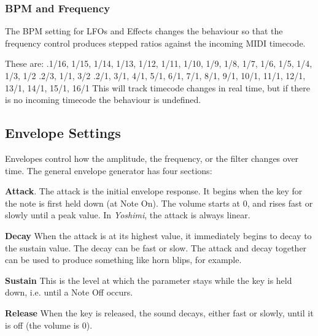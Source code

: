 \begin{flushleft}
  \begin{minipage}{\textwidth}
   \subsubsection{BPM and Frequency}
   \label{subsubsec:bpm_and_frequency}
   The BPM setting for LFOs and Effects changes the behaviour so that the frequency control produces
   stepped ratios against the incoming MIDI timecode.

   These are: \newline
    .\hspace{3em}1/16, 1/15, 1/14, 1/13, 1/12, 1/11, 1/10, 1/9, 1/8, 1/7, 1/6, 1/5, 1/4, 1/3, 1/2 \newline
    .\hspace{3em}2/3, 1/1, 3/2 \newline
    .\hspace{3em}2/1, 3/1, 4/1, 5/1, 6/1, 7/1, 8/1, 9/1, 10/1, 11/1, 12/1, 13/1, 14/1, 15/1, 16/1 \newline
    This will track timecode changes in real time, but if there is no incoming timecode the behaviour is undefined.
  \end{minipage}
\end{flushleft}

\subsection{Envelope Settings}
\label{subsec:envelope_settings}

   Envelopes control how the amplitude, the frequency, or the filter changes
   over time.  The general envelope generator has four sections:

   \begin{enumber}
      \item \textbf{Attack}.
         \label{ref:attack}
         The attack is the initial envelope response.
         It begins when the key for the note is first held down
         (at Note On).
         The volume starts at 0, and rises fast or slowly until a peak value.
         In \textsl{Yoshimi}, the attack is always linear.
      \item \textbf{Decay}
         \label{ref:decay}
         When the attack is at its highest value, it immediately begins
         to decay to the sustain value.  The decay can be fast or slow.
         The attack and decay together can be used to produce something like
         horn blips, for example.
      \item \textbf{Sustain}
         \label{ref:sustain}
         This is the level at which the parameter stays while the key is
         held down, i.e. until a Note Off occurs.
      \item \textbf{Release}
         \label{ref:release}
         When the key is released, the sound decays, either fast or slowly,
         until it is off (the volume is 0).
   \end{enumber}

